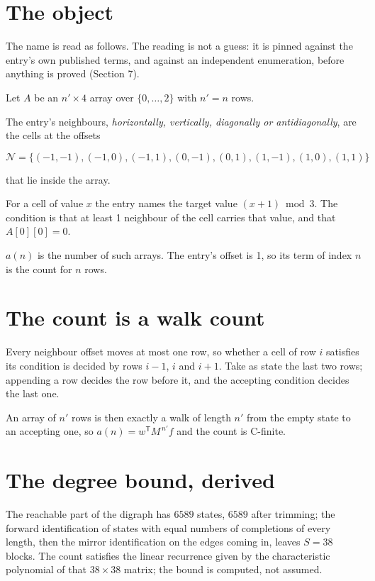 \documentclass[11pt]{article}
\theoremstyle{definition}
\begin{document}
\section{The object}

The name is read as follows. The reading is not a guess: it is pinned against the entry's own published terms, and against an independent enumeration, before anything is proved (Section 7).

Let $A$ be an $n' \times 4$ array over $\{0,\dots,2\}$ with $n' = n$ rows.

The entry's neighbours, {\itshape horizontally, vertically, diagonally or antidiagonally}, are the cells at the offsets

\[\mathcal{N} = \{(-1,-1), (-1,0), (-1,1), (0,-1), (0,1), (1,-1), (1,0), (1,1)\}\]

that lie inside the array.

For a cell of value $x$ the entry names the target value $(x + 1) \bmod 3$. The condition is that at least 1 neighbour of the cell carries that value, and that $A[0][0] = 0$.

$a(n)$ is the number of such arrays. The entry's offset is 1, so its term of index $n$ is the count for $n$ rows.

\section{The count is a walk count}

Every neighbour offset moves at most one row, so whether a cell of row $i$ satisfies its condition is decided by rows $i-1$, $i$ and $i+1$. Take as state the last two rows; appending a row decides the row before it, and the accepting condition decides the last one.

An array of $n'$ rows is then exactly a walk of length $n'$ from the empty state to an accepting one, so $a(n) = w^{\mathsf T}M^{\,n'}f$ and the count is C-finite.

\section{The degree bound, derived}

The reachable part of the digraph has $6589$ states, $6589$ after trimming; the forward identification of states with equal numbers of completions of every length, then the mirror identification on the edges coming in, leaves $S = 38$ blocks. The count satisfies the linear recurrence given by the characteristic polynomial of that $38\times38$ matrix; the bound is computed, not assumed.
\end{document}
